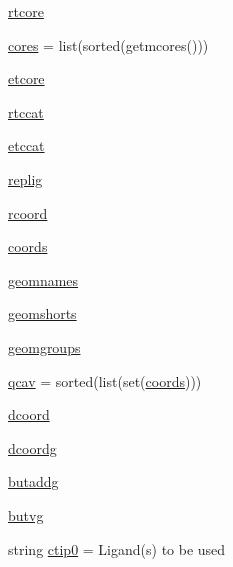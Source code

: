 \begin{DoxyCompactItemize}
\hyperlink{classmolSimplify_1_1Classes_1_1mGUI_1_1mGUI_a0f7ea044d9d6edbc1ad2c43430268bb6}{rtcore}
\item 
\hyperlink{classmolSimplify_1_1Classes_1_1mGUI_1_1mGUI_a53ac8df62f766964ff668bc8c9e82930}{cores} = list(sorted(getmcores()))
\item 
\hyperlink{classmolSimplify_1_1Classes_1_1mGUI_1_1mGUI_ab089693bcadbcf04c5d83b0382f718c0}{etcore}
\item 
\hyperlink{classmolSimplify_1_1Classes_1_1mGUI_1_1mGUI_ae1f6f016c4b69a239991dd81d3ca93c2}{rtccat}
\item 
\hyperlink{classmolSimplify_1_1Classes_1_1mGUI_1_1mGUI_a3a3e802f767f6cf7c0e00824fb8036e8}{etccat}
\item 
\hyperlink{classmolSimplify_1_1Classes_1_1mGUI_1_1mGUI_a5475a2dde60f4ea2abefa675f539cd23}{replig}
\item 
\hyperlink{classmolSimplify_1_1Classes_1_1mGUI_1_1mGUI_a3818d6c823520bae24b1fa54db1bed01}{rcoord}
\item 
\hyperlink{classmolSimplify_1_1Classes_1_1mGUI_1_1mGUI_a08fe615c0bebb8859d34e8ea918e8aaf}{coords}
\item 
\hyperlink{classmolSimplify_1_1Classes_1_1mGUI_1_1mGUI_ab1651e408fa769f57d3fc834d0f7d24c}{geomnames}
\item 
\hyperlink{classmolSimplify_1_1Classes_1_1mGUI_1_1mGUI_ac5889ad9e62c65afdb27e73c9b0004ad}{geomshorts}
\item 
\hyperlink{classmolSimplify_1_1Classes_1_1mGUI_1_1mGUI_a3c3a66df1d003b64bbb23f9fe327e2ea}{geomgroups}
\item 
\hyperlink{classmolSimplify_1_1Classes_1_1mGUI_1_1mGUI_a961642395a929de3867caf51cf4be9e5}{qcav} = sorted(list(set(\hyperlink{classmolSimplify_1_1Classes_1_1mGUI_1_1mGUI_a08fe615c0bebb8859d34e8ea918e8aaf}{coords})))
\item 
\hyperlink{classmolSimplify_1_1Classes_1_1mGUI_1_1mGUI_a368884e35db78c0ea298ba1f19b70c0b}{dcoord}
\item 
\hyperlink{classmolSimplify_1_1Classes_1_1mGUI_1_1mGUI_a254cd989a39c1c6b67e11f73a1fb7b80}{dcoordg}
\item 
\hyperlink{classmolSimplify_1_1Classes_1_1mGUI_1_1mGUI_a59f7cc4d91cd6797859c6ed9d1d7378b}{butaddg}
\item 
\hyperlink{classmolSimplify_1_1Classes_1_1mGUI_1_1mGUI_a6e5940ef6e1ff0685902c76894075d34}{butvg}
\item 
string \hyperlink{classmolSimplify_1_1Classes_1_1mGUI_1_1mGUI_aa56dd2adc764c7869b8e2fc67a5498b0}{ctip0} = \textquotesingle{}Ligand(s) to be used\textquotesingle{}

\end{DoxyCompactItemize}
